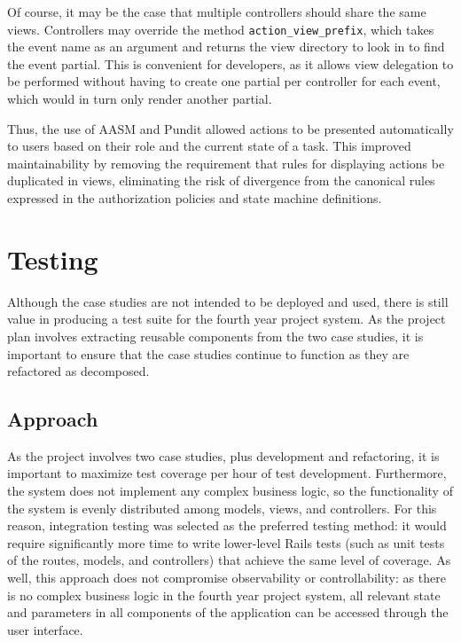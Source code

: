 \documentclass[document.tex]{subfiles}
\begin{document}
Of course, it may be the case that multiple controllers should share the same views. Controllers may override the method \verb!action_view_prefix!, which takes the event name as an argument and returns the view directory to look in to find the event partial. This is convenient for developers, as it allows view delegation to be performed without having to create one partial per controller for each event, which would in turn only render another partial.

Thus, the use of AASM and Pundit allowed actions to be presented automatically to users based on their role and the current state of a task. This improved maintainability by removing the requirement that rules for displaying actions be duplicated in views, eliminating the risk of divergence from the canonical rules expressed in the authorization policies and state machine definitions.

\section {Testing}

Although the case studies are not intended to be deployed and used, there is still value in producing a test suite for the fourth year project system.
As the project plan involves extracting reusable components from the two case studies, it is important to ensure that the case studies continue to function as they are refactored as decomposed.


\subsection {Approach}

As the project involves two case studies, plus development and refactoring,
it is important to maximize test coverage per hour of test development. Furthermore, the system does not implement any complex business logic, so the functionality of the system is evenly distributed among models, views, and controllers. For this reason, integration testing was selected as the preferred testing method: it would require significantly more time to write lower-level Rails tests (such as unit tests of the routes, models, and controllers) that achieve the same level of coverage. As well, this approach does not compromise observability or controllability: as there is no complex business logic in the fourth year project system, all relevant state and parameters in all components of the application can be accessed through the user interface.
\end{document}
